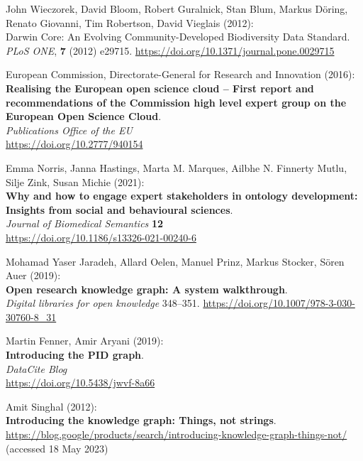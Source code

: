 \begin{thebibliography}{9}
John Wieczorek, David Bloom, Robert Guralnick, Stan Blum, Markus Döring,
Renato Giovanni, Tim Robertson, David Vieglais (2012): \\
Darwin {Core}:
{An Evolving Community-Developed Biodiversity Data Standard}. \emph{PLoS
ONE}, \textbf{7} (2012) e29715.
\url{https://doi.org/10.1371/journal.pone.0029715}

European Commission, Directorate-General for Research and Innovation (2016): \\ 
\textbf{Realising the European open science cloud – First report and recommendations of the Commission high level expert group on the European Open Science Cloud}. \\
\emph{Publications Office of the EU} \\
\url{https://doi.org/10.2777/940154}

Emma Norris, Janna Hastings, Marta M. Marques, Ailbhe N. Finnerty Mutlu,
Silje Zink, Susan Michie (2021): \\
\textbf{Why and how to engage expert
stakeholders in ontology development: Insights from social and
behavioural sciences}. \\
\emph{Journal of Biomedical Semantics} \textbf{12} \\
\url{https://doi.org/10.1186/s13326-021-00240-6}

Mohamad Yaser Jaradeh, Allard Oelen, Manuel Prinz, Markus Stocker, Sören Auer (2019): \\
\textbf{Open research knowledge graph: A system walkthrough}. \\
\emph{Digital libraries for open knowledge} 348--351.
\url{https://doi.org/10.1007/978-3-030-30760-8_31}

Martin Fenner, Amir Aryani (2019): \\
\textbf{Introducing the PID graph}. \\
\emph{DataCite Blog}\\
\url{https://doi.org/10.5438/jwvf-8a66}

Amit Singhal (2012): \\
\textbf{Introducing the knowledge graph: Things, not strings}.
\url{https://blog.google/products/search/introducing-knowledge-graph-things-not/}
(accessed 18 May 2023)


\end{thebibliography}
